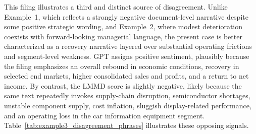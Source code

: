 This filing illustrates a third and distinct source of disagreement. Unlike
Example~1, which reflects a strongly negative document-level narrative despite
some positive strategic wording, and Example~2, where modest deterioration
coexists with forward-looking managerial language, the present case is better
characterized as a recovery narrative layered over substantial operating
frictions and segment-level weakness. GPT assigns positive sentiment, plausibly
because the filing emphasizes an overall rebound in economic conditions,
recovery in selected end markets, higher consolidated sales and profits, and a
return to net income. By contrast, the LMMD score is slightly negative, likely
because the same text repeatedly invokes supply-chain disruption, semiconductor
shortages, unstable component supply, cost inflation, sluggish display-related
performance, and an operating loss in the car information equipment segment.
Table~\ref{tab:example3_disagreement_phrases} illustrates these opposing
signals.

